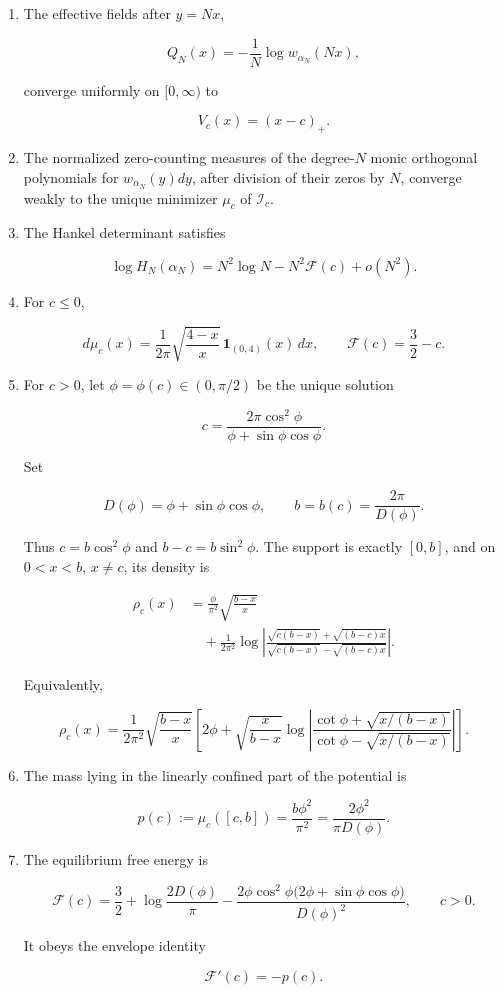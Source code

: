 \begin{enumerate}
\def\labelenumi{\arabic{enumi}.}
\item
  The effective fields after \(y=Nx\),

  \[
  Q_N(x)=-\frac1N\log w_{\alpha_N}(Nx),
  \]

  converge uniformly on \([0,\infty)\) to

  \[
  V_c(x)=(x-c)_+.
  \]
\item
  The normalized zero-counting measures of the degree-\(N\) monic
  orthogonal polynomials for \(w_{\alpha_N}(y)dy\), after division of their
  zeros by \(N\), converge weakly to the unique minimizer \(\mu_c\) of
  \(\mathcal I_c\).
\item
  The Hankel determinant satisfies

  \[
  \boxed{\ \log H_N(\alpha_N)
  =N^2\log N-N^2\mathcal F(c)+o(N^2).\ }
  \]
\item
  For \(c\le0\),

  \[
  d\mu_c(x)=\frac1{2\pi}\sqrt{\frac{4-x}{x}}\,
  \mathbf1_{(0,4)}(x)\,dx,
  \qquad
  \mathcal F(c)=\frac32-c.
  \]
\item
  For \(c>0\), let \(\phi=\phi(c)\in(0,\pi/2)\) be the unique solution

  \[
  \boxed{\ c=\frac{2\pi\cos^2\phi}
  {\phi+\sin\phi\cos\phi}.\ } \tag{DS-1.1}
  \]

  Set

  \[
  D(\phi)=\phi+\sin\phi\cos\phi,
  \qquad
  b=b(c)=\frac{2\pi}{D(\phi)}.
  \tag{DS-1.2}
  \]

  Thus \(c=b\cos^2\phi\) and \(b-c=b\sin^2\phi\). The support is exactly
  \([0,b]\), and on \(0<x<b\), \(x\ne c\), its density is

  \[
  \boxed{
  \begin{aligned}
  \rho_c(x)
  &=\frac{\phi}{\pi^2}\sqrt{\frac{b-x}{x}}\\
  &\quad+\frac1{2\pi^2}
  \log\left|
  \frac{\sqrt{c(b-x)}+\sqrt{(b-c)x}}
       {\sqrt{c(b-x)}-\sqrt{(b-c)x}}
  \right|.
  \end{aligned}} \tag{DS-1.3}
  \]

  Equivalently,

  \[
  \rho_c(x)=\frac1{2\pi^2}\sqrt{\frac{b-x}{x}}
  \left[
  2\phi+\sqrt{\frac{x}{b-x}}
  \log\left|
  \frac{\cot\phi+\sqrt{x/(b-x)}}
       {\cot\phi-\sqrt{x/(b-x)}}
  \right|
  \right]. \tag{DS-1.4}
  \]
\item
  The mass lying in the linearly confined part of the potential is

  \[
  \boxed{\ p(c):=\mu_c([c,b])
  =\frac{b\phi^2}{\pi^2}
  =\frac{2\phi^2}{\pi D(\phi)}.\ } \tag{DS-1.5}
  \]
\item
  The equilibrium free energy is

  \[
  \boxed{
  \mathcal F(c)=
  \frac32+\log\frac{2D(\phi)}\pi
  -\frac{2\phi\cos^2\phi
  \bigl(2\phi+\sin\phi\cos\phi\bigr)}{D(\phi)^2},
  \qquad c>0.} \tag{DS-1.6}
  \]

  It obeys the envelope identity

  \[
  \mathcal F'(c)=-p(c). \tag{DS-1.7}
  \]
\end{enumerate}

